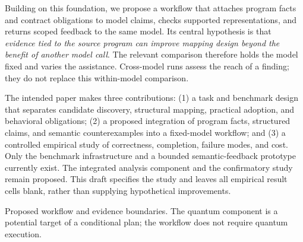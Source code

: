 Building on this foundation, we propose a workflow that attaches program facts
and contract obligations to model claims, checks supported representations, and
returns scoped feedback to the same model. Its central hypothesis is that
\emph{evidence tied to the source program can improve mapping design beyond the
benefit of another model call}. The relevant comparison therefore holds the
model fixed and varies the assistance. Cross-model runs assess the reach of a
finding; they do not replace this within-model comparison.

The intended paper makes three contributions: (1) a task and benchmark design
that separates candidate discovery, structural mapping, practical adoption, and
behavioral obligations; (2) a proposed integration of program facts, structured
claims, and semantic counterexamples into a fixed-model workflow; and (3) a
controlled empirical study of correctness, completion, failure modes, and cost.
Only the benchmark infrastructure and a bounded semantic-feedback prototype
currently exist. The integrated analysis component and the confirmatory study
remain proposed. This draft specifies the study and leaves all empirical result
cells blank, rather than supplying hypothetical improvements.

{Proposed workflow and evidence boundaries. The quantum component is a potential
target of a conditional plan; the workflow does not require quantum execution.}
